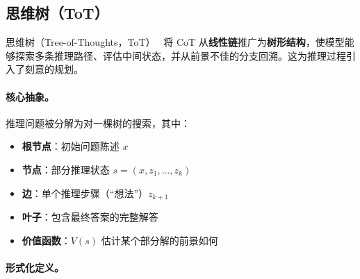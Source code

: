 \subsection{思维树（ToT）}
\label{subsec:tot_method}

思维树（Tree-of-Thoughts，ToT）~\cite{yao2024tree} 将 CoT 从\textbf{线性链}推广为\textbf{树形结构}，使模型能够探索多条推理路径、评估中间状态，并从前景不佳的分支回溯。这为推理过程引入了刻意的规划。

\paragraph{核心抽象。}
\label{core-abstraction.}

推理问题被分解为对一棵树的搜索，其中：

\begin{itemize}
  \item \textbf{根节点}：初始问题陈述 $x$
  \item \textbf{节点}：部分推理状态 $s = (x, z_1, \ldots, z_k)$
  \item \textbf{边}：单个推理步骤（“想法”）$z_{k+1}$
  \item \textbf{叶子}：包含最终答案的完整解答
  \item \textbf{价值函数}：$V(s)$ 估计某个部分解的前景如何
\end{itemize}

\paragraph{形式化定义。}
\label{formal-definition.}

